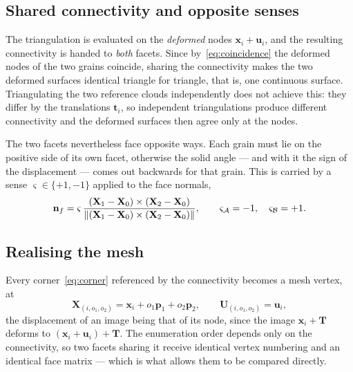 \subsection*{Shared connectivity and opposite senses}

The triangulation is evaluated on the \emph{deformed} nodes
$\mathbf{x}_i + \mathbf{u}_i$, and the resulting connectivity is handed to
\emph{both} facets. Since by~\eqref{eq:coincidence} the deformed nodes of the
two grains coincide, sharing the connectivity makes the two deformed surfaces
identical triangle for triangle, that is, one continuous surface. Triangulating
the two reference clouds independently does not achieve this: they differ by the
translations $\mathbf{t}_i$, so independent triangulations produce different
connectivity and the deformed surfaces then agree only at the nodes.

The two facets nevertheless face opposite ways. Each grain must lie on the
positive side of its own facet, otherwise the solid angle --- and with it the
sign of the displacement --- comes out backwards for that grain. This is carried
by a sense $\varsigma \in \{+1,-1\}$ applied to the face normals,
\begin{equation}
  \mathbf{n}_f
  = \varsigma\,
    \frac{(\mathbf{X}_1 - \mathbf{X}_0)\times(\mathbf{X}_2 - \mathbf{X}_0)}
         {\lVert (\mathbf{X}_1 - \mathbf{X}_0)\times(\mathbf{X}_2 - \mathbf{X}_0) \rVert},
  \qquad
  \varsigma_{\mathcal{A}} = -1,
  \quad
  \varsigma_{\mathcal{B}} = +1 .
  \label{eq:sense}
\end{equation}

\subsection*{Realising the mesh}

Every corner~\eqref{eq:corner} referenced by the connectivity becomes a mesh
vertex, at
\begin{equation}
  \mathbf{X}_{(i,o_1,o_2)} = \mathbf{x}_i + o_1\mathbf{p}_1 + o_2\mathbf{p}_2 ,
  \qquad
  \mathbf{U}_{(i,o_1,o_2)} = \mathbf{u}_i ,
  \label{eq:mesh-vertex}
\end{equation}
the displacement of an image being that of its node, since the image
$\mathbf{x}_i + \mathbf{T}$ deforms to
$(\mathbf{x}_i+\mathbf{u}_i) + \mathbf{T}$. The enumeration order depends only
on the connectivity, so two facets sharing it receive identical vertex numbering
and an identical face matrix --- which is what allows them to be compared
directly.

